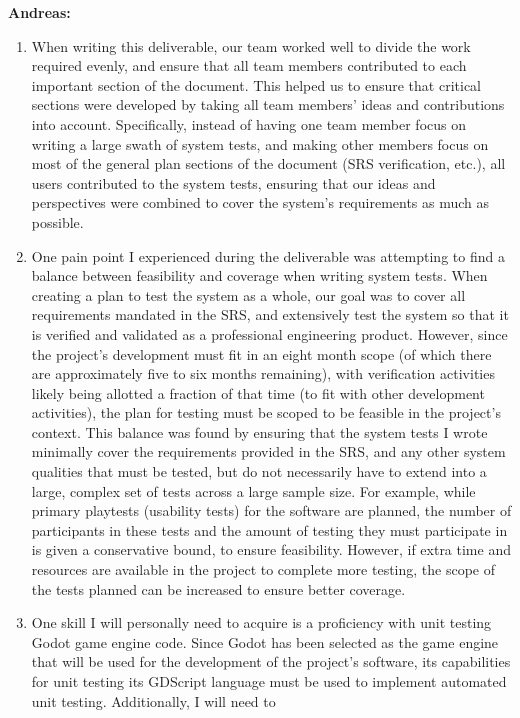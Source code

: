 \documentclass[12pt, titlepage]{article}
\begin{document}
\textbf{Andreas:}
\begin{enumerate}
	\item When writing this deliverable, our team worked well to divide the 
	work required evenly, and ensure that all team members contributed to each 
	important section of the document. This helped us to ensure that critical 
	sections were developed by taking all team members' ideas and contributions 
	into account. Specifically, instead of having one team member focus on 
	writing a large swath of system tests, and making other members focus on 
	most of the general plan sections of the document (SRS verification, etc.), 
	all users contributed to the system tests, ensuring that our ideas and 
	perspectives were combined to cover the system's requirements as much as 
	possible.
	\item One pain point I experienced during the deliverable was attempting to 
	find a balance between feasibility and coverage when writing system tests. 
	When creating a plan to test the system as a whole, our goal was to cover 
	all requirements mandated in the SRS, and extensively test the system so 
	that it is verified and validated as a professional engineering product. 
	However, since the project's development must fit in an eight month scope 
	(of which there are approximately five to six months remaining), with 
	verification 
	activities likely being allotted a fraction of that time (to fit with other 
	development activities), the plan for testing must be scoped to be feasible 
	in the project's context. This balance was found by ensuring that the 
	system tests I wrote minimally cover the requirements provided in the SRS, 
	and any other system qualities that must be tested, but do not necessarily 
	have to extend into a large, complex set of tests across a large sample 
	size. For example, while primary playtests (usability tests) for the 
	software are planned, the number of participants in these tests and the 
	amount of testing they must participate in is given a conservative bound, 
	to ensure feasibility. However, if extra time and resources are available 
	in the project to complete more testing, the scope of the tests planned can 
	be increased to ensure better coverage.
	\item One skill I will personally need to acquire is a proficiency with 
	unit testing Godot game engine code. Since Godot has been selected as the 
	game engine that will be used for the development of the project's 
	software, its capabilities for unit testing its GDScript language must be 
	used to implement automated unit testing. Additionally, I will need to 

\end{enumerate}
\end{document}
